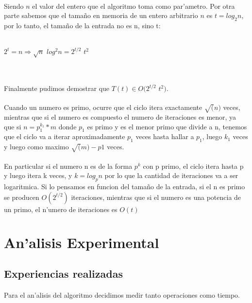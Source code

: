 \paragraph{}
Siendo $n$ el valor del entero que el algoritmo toma como par'ametro. Por otra parte sabemos que 
el tama\~{n}o en memoria de un entero arbitrario $n$ es $t = log_2 n$, por lo tanto, el tama\~{n}o de la entrada no es n, sino t:\\
\\
\centerline{$2^t = n \Rightarrow \sqrt{n}$ $log^2 n = 2^{t/2}$ $t^2$}
\\
\paragraph{}
Finalmente pudimos demostrar que $T(t) \in O(2^{t/2} $ $t^2)$.
\paragraph{}
Cuando un numero es primo, ocurre que el ciclo itera exactamente $\sqrt(n)$ veces, mientras que si el numero es compuesto el numero de iteraciones es menor, ya que si $n = p_{1}^{k_{1}}*m$ donde $p_1$ es primo y es el menor primo que divide a n, tenemos que el ciclo va a iterar aproximadamente $p_1$ veces hasta hallar a $p_1$, luego $k_1$ veces y luego como maximo $\sqrt(m)-p1$ veces. 
\paragraph{}
En particular si el numero n es de la forma $p^k$ con p primo, el ciclo itera hasta p y luego itera k veces, y $k=log_p n$ por lo que la cantidad de iteraciones va a ser logaritmica. Si lo pensamos en funcion del tama\~{n}o de la entrada, si el n es primo se producen $O(2^{t/2})$ iteraciones, mientras que si el numero es una potencia de un primo, el n'umero de iteraciones es $O(t)$


\newpage
\section{An'alisis Experimental}
\subsection{Experiencias realizadas}
\paragraph{}
Para el an'alisis del algoritmo decidimos medir tanto operaciones como tiempo. 
